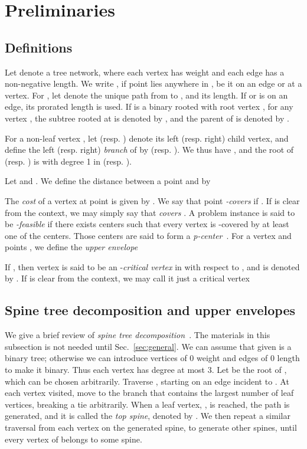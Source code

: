 \documentclass{llncs}
\begin{document}
{\section{Preliminaries}\label{sec:preliminary}

\subsection{Definitions}\label{sec:def}
Let  denote a tree network,
where each vertex  has weight 
and each edge  has a non-negative length.
We write , if point  lies anywhere in , be it on an edge or at a vertex.
For , 
let  denote the unique path from  to ,
and  its length.
If  or  is on an edge,
its prorated length is used.
If  is a binary rooted with root vertex ,
for any vertex , 
the subtree rooted at  is denoted by ,
and the parent of  is denoted by .

For a non-leaf vertex ,
let  (resp. ) denote its left (resp. right) child vertex,
and define the left (resp. right) {\em branch} of  by
 (resp. ).
We thus have ,
and the root of  (resp. ) is  with degree 1
in  (resp. ).

Let  and .
We define the distance between a point  and  by

The {\em cost} of a vertex  at point  is given by .
We say that point  {\em -covers} 
if .
If  is clear from the context, we may simply say that  {\em covers} .
A problem instance is said to be {\em -feasible} if there exists  centers
such that every vertex is -covered by at least one of the centers.
Those  centers are said to form a {\em p-center}~\cite{kariv1979b}. 
For a vertex  and points ,
we define the {\em upper envelope}

If , 
then vertex  is said to be an -{\em critical vertex} in  with respect to ,
and is denoted by .  
If  is clear from the context,
we may call it just a critical vertex

\subsection{Spine tree decomposition and upper envelopes}\label{sec:std}
We give a brief review of {\em spine tree decomposition}~\cite{benkoczi2004,benkoczi2003}.
The materials in this subsection is not needed until Sec.~\ref{sec:general}.
We can assume that given  is a binary tree;
otherwise we can introduce  vertices of 0 weight and  edges of
0 length to make it binary.
Thus each vertex has degree at most 3.
Let  be the root of ,
which can be chosen arbitrarily.
Traverse , starting on an edge incident to .
At each vertex visited,
move to the branch that contains the largest number of leaf vertices,
breaking a tie arbitrarily.
When a leaf vertex, , is reached, the path  is generated,
and it is called the {\em top spine}, denoted by .
We then repeat a similar traversal from each vertex on the generated spine,
to generate other spines, until every vertex of  belongs to some spine.

}
\end{document}
